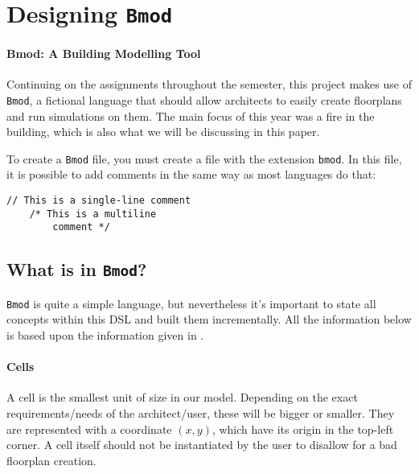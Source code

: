 \documentclass[review]{elsarticle}
\begin{document}
\section{Designing \texttt{Bmod}}
\label{sec:bmod}
\paragraph{Bmod: A Building Modelling Tool} Continuing on the assignments throughout the semester, this project makes use of \texttt{Bmod}, a fictional language that should allow architects to easily create floorplans and run simulations on them. The main focus of this year was a fire in the building, which is also what we will be discussing in this paper.

To create a \texttt{Bmod} file, you must create a file with the extension \texttt{bmod}. In this file, it is possible to add comments in the same way as most languages do that:
\begin{lstlisting}[language=Bmod]
	// This is a single-line comment
	/* This is a multiline
		comment */
\end{lstlisting}

\subsection{What is in \texttt{Bmod}?}

\texttt{Bmod} is quite a simple language, but nevertheless it's important to state all concepts within this \textsf{DSL} and built them incrementally. All the information below is based upon the information given in \cite{A1}.

\paragraph{Cells} A cell is the smallest unit of size in our model. Depending on the exact requirements/needs of the architect/user, these will be bigger or smaller. They are represented with a coordinate $(x, y)$, which have its origin in the top-left corner. A cell itself should not be instantiated by the user to disallow for a bad floorplan creation.
\end{document}

